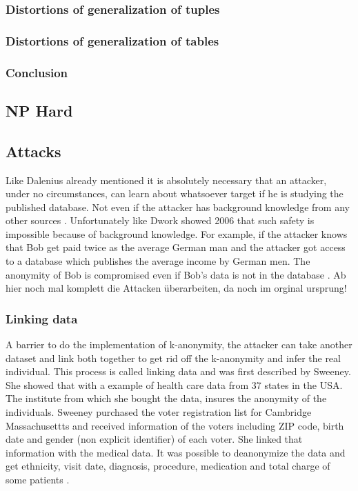 \documentclass{llncs}
\begin{document}
\subsubsection{Distortions of generalization of tuples}
\subsubsection{Distortions of generalization of tables}
\subsubsection{Conclusion}

\subsection{NP Hard}

\subsection{Attacks}

Like Dalenius already mentioned it is absolutely necessary that an attacker, under no circumstances, can learn about whatsoever target if he is studying the published database. Not even if the attacker has background knowledge from any other sources  \cite{Dalenius1977}. Unfortunately like Dwork showed 2006 that such safety is impossible because of background knowledge. For example, if the attacker knows that Bob get paid twice as the average German man and the attacker got access to a database which publishes the average income by German men. The anonymity of Bob is compromised even if Bob's data is not in the database \cite{dwork2011differential}.  
Ab hier noch mal komplett die Attacken überarbeiten, da noch im orginal ursprung!
\subsubsection{Linking data}
A barrier to do the implementation of k-anonymity, the attacker can take another dataset and link both together to get rid off the k-anonymity and infer the real individual. This process is called linking data and was first described by Sweeney\cite{sweeney2002k}. She showed that with a example of health care data from 37 states in the USA. The institute from which she bought the data, insures the anonymity of the individuals. Sweeney purchased the voter registration list for Cambridge Massachusettts and received information of the voters including ZIP code, birth date and gender (non explicit identifier) of each voter. She linked that information with the medical data. It was possible to deanonymize the data  and get ethnicity, visit date, diagnosis, procedure, medication and total charge of some patients \cite{sweeney2002k}. 
\end{document}
